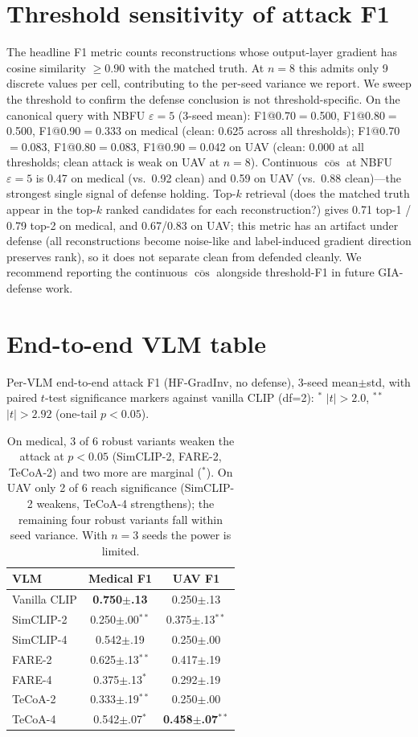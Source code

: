 \documentclass[11pt]{article}
\begin{document}
\section{Threshold sensitivity of attack F1}
\label{app:thresholds}
The headline F1 metric counts reconstructions whose output-layer gradient has cosine similarity $\ge 0.90$ with the matched truth. At $n{=}8$ this admits only 9 discrete values per cell, contributing to the per-seed variance we report. We sweep the threshold to confirm the defense conclusion is not threshold-specific. On the canonical query with NBFU $\varepsilon{=}5$ (3-seed mean): F1@0.70$=$0.500, F1@0.80$=$0.500, F1@0.90$=$0.333 on medical (clean: 0.625 across all thresholds); F1@0.70$=$0.083, F1@0.80$=$0.083, F1@0.90$=$0.042 on UAV (clean: 0.000 at all thresholds; clean attack is weak on UAV at $n{=}8$). Continuous $\overline{\cos}$ at NBFU $\varepsilon{=}5$ is 0.47 on medical (vs.\ 0.92 clean) and 0.59 on UAV (vs.\ 0.88 clean)---the strongest single signal of defense holding. Top-$k$ retrieval (does the matched truth appear in the top-$k$ ranked candidates for each reconstruction?) gives 0.71 top-1 / 0.79 top-2 on medical, and 0.67/0.83 on UAV; this metric has an artifact under defense (all reconstructions become noise-like and label-induced gradient direction preserves rank), so it does not separate clean from defended cleanly. We recommend reporting the continuous $\overline{\cos}$ alongside threshold-F1 in future GIA-defense work.

\section{End-to-end VLM table}
\label{app:vlm}
Per-VLM end-to-end attack F1 (HF-GradInv, no defense), 3-seed mean$\pm$std, with paired $t$-test significance markers against vanilla CLIP (df=2): $^{*}$ $|t|\!>\!2.0$, $^{**}$ $|t|\!>\!2.92$ (one-tail $p\!<\!0.05$).

\begin{table}[h]
\centering
\small
\setlength{\tabcolsep}{4pt}
\begin{tabular}{lcc}
\toprule
VLM & Medical F1 & UAV F1 \\
\midrule
Vanilla CLIP   & \textbf{0.750$\pm$.13} & 0.250$\pm$.13 \\
SimCLIP-2 & 0.250$\pm$.00$^{**}$ & 0.375$\pm$.13$^{**}$ \\
SimCLIP-4 & 0.542$\pm$.19 & 0.250$\pm$.00 \\
FARE-2    & 0.625$\pm$.13$^{**}$ & 0.417$\pm$.19 \\
FARE-4    & 0.375$\pm$.13$^{*}$  & 0.292$\pm$.19 \\
TeCoA-2   & 0.333$\pm$.19$^{**}$ & 0.250$\pm$.00 \\
TeCoA-4   & 0.542$\pm$.07$^{*}$  & \textbf{0.458$\pm$.07}$^{**}$ \\
\bottomrule
\end{tabular}
\caption{On medical, 3 of 6 robust variants weaken the attack at $p\!<\!0.05$ (SimCLIP-2, FARE-2, TeCoA-2) and two more are marginal ($^{*}$). On UAV only 2 of 6 reach significance (SimCLIP-2 weakens, TeCoA-4 strengthens); the remaining four robust variants fall within seed variance. With $n{=}3$ seeds the power is limited.}
\label{tab:vlm_endtoend}
\end{table}
\end{document}
